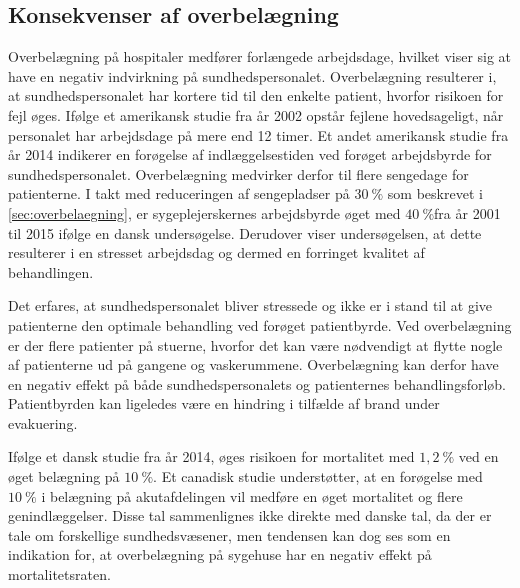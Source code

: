 \subsection{Konsekvenser af overbelægning}

Overbelægning på hospitaler medfører forlængede arbejdsdage, hvilket viser sig at have en negativ indvirkning på sundhedspersonalet.\cite{Kjeldsen2015} \cite{Dinges2004} Overbelægning resulterer i, at sundhedspersonalet har kortere tid til den enkelte patient, hvorfor risikoen for fejl øges. Ifølge et amerikansk studie fra år 2002 opstår fejlene hovedsageligt, når personalet har arbejdsdage på mere end 12 timer.\cite{Dinges2004} Et andet amerikansk studie fra år 2014 indikerer en forøgelse af indlæggelsestiden ved forøget arbejdsbyrde for sundhedspersonalet\cite{Elliott2014}. Overbelægning medvirker derfor til flere sengedage for patienterne. I takt med reduceringen af sengepladser på $30~\%$ som beskrevet i \autoref{sec:overbelaegning}, er sygeplejerskernes arbejdsbyrde øget med $40~\%$fra år 2001 til 2015 ifølge en dansk undersøgelse. Derudover viser undersøgelsen, at dette resulterer i en stresset arbejdsdag og dermed en forringet kvalitet af behandlingen.\cite{Kjeldsen2015}  


Det erfares, at sundhedspersonalet bliver stressede og ikke er i stand til at give patienterne den optimale behandling ved forøget patientbyrde. \cite{Aiken2002} Ved overbelægning er der flere patienter på stuerne, hvorfor det kan være nødvendigt at flytte nogle af patienterne ud på gangene og vaskerummene. Overbelægning kan derfor have en negativ effekt på både sundhedspersonalets og patienternes behandlingsforløb. Patientbyrden kan ligeledes være en hindring i tilfælde af brand under evakuering. 


Ifølge et dansk studie fra år 2014, øges risikoen for mortalitet med $1,2~\%$ ved en øget belægning på $10~\%$. \cite{Madsen2014} Et  canadisk studie understøtter, at en forøgelse med $10~\%$ i belægning på akutafdelingen vil medføre en øget mortalitet og flere genindlæggelser.\cite{McCusker2014} Disse tal sammenlignes ikke direkte med danske tal, da der er tale om forskellige sundhedsvæsener, men tendensen kan dog ses som en indikation for, at overbelægning på sygehuse har en negativ effekt på mortalitetsraten. \cite{denstoredanskeordbog2}  